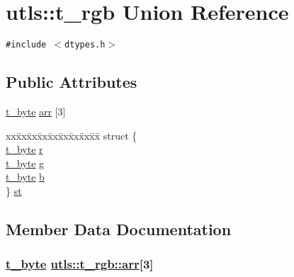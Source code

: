 \hypertarget{unionutls_1_1t__rgb}{
\section{utls::t\_\-rgb Union Reference}
\label{unionutls_1_1t__rgb}
}
{\tt \#include $<$dtypes.h$>$}

\subsection*{Public Attributes}
\begin{CompactItemize}
\item 
\hyperlink{namespaceutls_dc090f96c41011207bfa8d70a498322f}{t\_\-byte} \hyperlink{unionutls_1_1t__rgb_d7df8031867c3be3cda0d50e3ebe4938}{arr} \mbox{[}3\mbox{]}
\item 
\begin{tabbing}
xx\=xx\=xx\=xx\=xx\=xx\=xx\=xx\=xx\=\kill
struct \{\\
\>\hyperlink{namespaceutls_dc090f96c41011207bfa8d70a498322f}{t\_byte} \hyperlink{unionutls_1_1t__rgb_ce6ec6d60cfbd757ec84e020e3b1671c}{r}\\
\>\hyperlink{namespaceutls_dc090f96c41011207bfa8d70a498322f}{t\_byte} \hyperlink{unionutls_1_1t__rgb_4fc1c5d0c41a0f3117770b8872e07c6d}{g}\\
\>\hyperlink{namespaceutls_dc090f96c41011207bfa8d70a498322f}{t\_byte} \hyperlink{unionutls_1_1t__rgb_debb0d24da836f9eb6001f3889fac9d4}{b}\\
\} \hyperlink{unionutls_1_1t__rgb_f4692812e521eec39b7db2194f76ee17}{st}\\

\end{tabbing}\end{CompactItemize}


\subsection{Member Data Documentation}
\hypertarget{unionutls_1_1t__rgb_d7df8031867c3be3cda0d50e3ebe4938}{
\subsubsection[arr]{\setlength{\rightskip}{0pt plus 5cm}\hyperlink{namespaceutls_dc090f96c41011207bfa8d70a498322f}{t\_\-byte} \hyperlink{unionutls_1_1t__rgb_d7df8031867c3be3cda0d50e3ebe4938}{utls::t\_\-rgb::arr}\mbox{[}3\mbox{]}}}
\label{unionutls_1_1t__rgb_d7df8031867c3be3cda0d50e3ebe4938}


